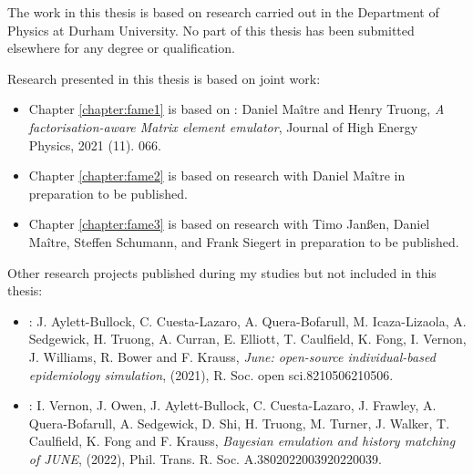 \documentclass[twoside,openright,frontopenright]{ip3thesis}
\begin{document}
\begin{declaration*}
%
	The work in this thesis is based on research carried out in the Department of
	Physics at Durham University. No part of this thesis has been
	submitted elsewhere for any degree or qualification.

	Research presented in this thesis is based on joint work:
	\begin{itemize}
		\item Chapter \ref{chapter:fame1} is based on \cite{Maitre:2021uaa}: Daniel Ma\^{i}tre and Henry Truong, \textit{A factorisation-aware Matrix element emulator}, Journal of High Energy Physics, 2021 (11). 066.
		\item Chapter \ref{chapter:fame2} is based on research with Daniel Ma\^{i}tre in preparation to be published.
		\item Chapter \ref{chapter:fame3} is based on research with Timo Janßen, Daniel Ma\^{i}tre, Steffen Schumann, and Frank Siegert in preparation to be published.
	\end{itemize}

	Other research projects published during my studies but not included
	in this thesis:
	\begin{itemize}
		\item \cite{doi:10.1098/rsos.210506}: J. Aylett-Bullock, C. Cuesta-Lazaro, A. Quera-Bofarull, M. Icaza-Lizaola, A. Sedgewick, H. Truong, A. Curran, E. Elliott, T. Caulfield, K. Fong, I. Vernon, J. Williams, R. Bower and F. Krauss, \textit{June: open-source individual-based epidemiology simulation}, (2021), R. Soc. open sci.8210506210506.
		\item \cite{doi:10.1098/rsta.2022.0039}: I. Vernon, J. Owen, J. Aylett-Bullock, C. Cuesta-Lazaro, J. Frawley, A. Quera-Bofarull, A. Sedgewick, D. Shi, H. Truong, M. Turner, J. Walker, T. Caulfield, K. Fong and F. Krauss, \textit{Bayesian emulation and history matching of JUNE}, (2022), Phil. Trans. R. Soc. A.3802022003920220039.
	\end{itemize}

%
\end{declaration*}
\end{document}
